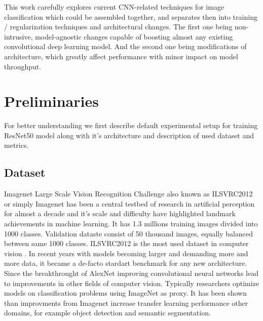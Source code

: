 
This work carefully explores current CNN-related techniques for image classification which could be assembled together, and separates then into training / regularization techniques and architectural changes. The first one being non-intrusive, model-agnostic changes capable of boosting almost any existing convolutional deep learning model. And the second one being modifications of architecture, which greatly affect performance with minor impact on model throughput. 



\section{Preliminaries}
For better understanding we first describe default experimental setup for training ResNet50 model along with it's architecture and description of used dataset and metrics. 

\subsection{Dataset} \label{subsec: imagenet}


Imagenet Large Scale Vision Recognition Challenge also known as ILSVRC2012 or simply Imagenet has been a central testbed of research in artificial perception for almost a decade and it's scale and difficulty have highlighted landmark achievements in machine learning. It has 1.3 millions training images divided into 1000 classes. Validation dataste consist of 50 thousand images, equally balanced between same 1000 classes. ILSVRC2012 is the most used dataset in computer vision \cite{something related}. In recent years with models becoming larger and demanding more and more data, it became a de-facto stardart benchmark for any new architecture. Since the breakthrought of AlexNet improving convolutional neural networks lead to improvements in other fields of computer vision. Typically researchers optimize models on classification problems using ImageNet \cite{deng2009_imagenet} as proxy. It has been shown \cite{he2019bag_of_tricks} \cite{kornblith2019better} than improvments from Imagenet increase transfer learning performance other domains, for example object detection and semantic segmentation.


